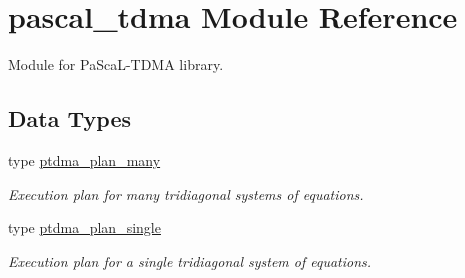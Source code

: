 \hypertarget{namespacepascal__tdma}{}\section{pascal\+\_\+tdma Module Reference}
\label{namespacepascal__tdma}


Module for Pa\+Sca\+L-\/\+T\+D\+MA library.  


\subsection*{Data Types}
\begin{DoxyCompactItemize}
\item 
type \mbox{\hyperlink{structpascal__tdma_1_1ptdma__plan__many}{ptdma\+\_\+plan\+\_\+many}}
\begin{DoxyCompactList}\small\item\em Execution plan for many tridiagonal systems of equations. \end{DoxyCompactList}\item 
type \mbox{\hyperlink{structpascal__tdma_1_1ptdma__plan__single}{ptdma\+\_\+plan\+\_\+single}}
\begin{DoxyCompactList}\small\item\em Execution plan for a single tridiagonal system of equations. \end{DoxyCompactList}\end{DoxyCompactItemize}
